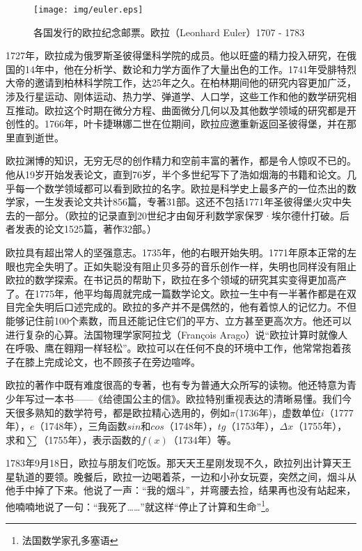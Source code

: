 \documentclass{article}
\begin{document}
\begin{figure}[htbp]
 \centering
 \texttt{[image: img/euler.eps]}
 \captionsetup{labelformat=empty}
 \caption{各国发行的欧拉纪念邮票。欧拉（Leonhard Euler）1707 - 1783}
 \label{fig:Arithmetica}
\end{figure}

1727年，欧拉成为俄罗斯圣彼得堡科学院的成员。他以旺盛的精力投入研究，在俄国的14年中，他在分析学、数论和力学方面作了大量出色的工作。1741年受腓特烈大帝的邀请到柏林科学院工作，达25年之久。在柏林期间他的研究内容更加广泛，涉及行星运动、刚体运动、热力学、弹道学、人口学，这些工作和他的数学研究相互推动。欧拉这个时期在微分方程、曲面微分几何以及其他数学领域的研究都是开创性的。1766年，叶卡捷琳娜二世在位期间，欧拉应邀重新返回圣彼得堡，并在那里直到逝世。

欧拉渊博的知识，无穷无尽的创作精力和空前丰富的著作，都是令人惊叹不已的。他从19岁开始发表论文，直到76岁，半个多世纪写下了浩如烟海的书籍和论文。几乎每一个数学领域都可以看到欧拉的名字。欧拉是科学史上最多产的一位杰出的数学家，一生发表论文共计856篇，专著31部。这还不包括1771年圣彼得堡火灾中失去的一部分。（欧拉的记录直到20世纪才由匈牙利数学家保罗·埃尔德什打破。后者发表的论文1525篇，著作32部。\cite{Wiki-Euler}）

欧拉具有超出常人的坚强意志。1735年，他的右眼开始失明。1771年原本正常的左眼也完全失明了。正如失聪没有阻止贝多芬的音乐创作一样，失明也同样没有阻止欧拉的数学探索\cite{HanXueTao2009}。在书记员的帮助下，欧拉在多个领域的研究其实变得更加高产了。在1775年，他平均每周就完成一篇数学论文。欧拉一生中有一半著作都是在双目完全失明后口述完成的。欧拉的多产并不是偶然的，他有着惊人的记忆力。不但能够记住前100个素数，而且还能记住它们的平方、立方甚至更高次方。他还可以进行复杂的心算。法国物理学家阿拉戈（François Arago）说“欧拉计算时就像人在呼吸、鹰在翱翔一样轻松”。欧拉可以在任何不良的环境中工作，他常常抱着孩子在膝上完成论文，也不顾孩子在旁边喧哗。

欧拉的著作中既有难度很高的专著，也有专为普通大众所写的读物。他还特意为青少年写过一本书——《给德国公主的信》。欧拉特别重视表达的清晰易懂。我们今天很多熟知的数学符号，都是欧拉精心选用的，例如$\pi$(1736年)，虚数单位$i$（1777年），$e$（1748年），三角函数$sin$和$cos$（1748年），$tg$（1753年），$\Delta x$（1755年），求和$\sum$（1755年），表示函数的$f(x)$（1734年）等\cite{HanXueTao2009}。

1783年9月18日，欧拉与朋友们吃饭。那天天王星刚发现不久，欧拉列出计算天王星轨道的要领。晚餐后，欧拉一边喝着茶，一边和小孙女玩耍，突然之间，烟斗从他手中掉了下来。他说了一声：“我的烟斗”，并弯腰去捡，结果再也没有站起来，他喃喃地说了一句：“我死了……”就这样“停止了计算和生命”\footnote{法国数学家孔多塞语}。
\end{document}
